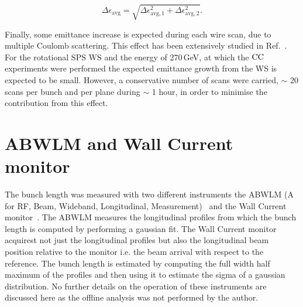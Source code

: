 \begin{equation}\label{eq:combined_uncertainty_ws}
   \Delta \epsilon_\mathrm{avg} = \sqrt{\Delta \epsilon_\mathrm{avg, 1} ^2 + \Delta \epsilon_\mathrm{avg, 2} ^2}.
\end{equation}

Finally, some emittance increase is expected during each wire scan, due to multiple Coulomb scattering. This effect has been extensively studied in Ref.~\cite{Roncarolo:1481835}. For the rotational SPS WS and the energy of 270\,GeV, at which the ${\mathrm{CC}}$ experiments were performed the expected emittance growth from the WS is expected to be small. However, a conservative number of scans were carried, $\sim$ 20 scans per bunch and per plane during $\sim$ 1 hour, in order to minimise the contribution from this effect.

\section{ABWLM and Wall Current monitor}\label{sec:ABWLM_WallCurrentMonitor}

\begin{sloppypar}
The bunch length was measured with two different instruments the ABWLM (A for RF, Beam, Wideband, Longitudinal, Measurement)~\cite{ABWLM} and the Wall Current monitor~\cite{Papotti:1124099}. The ABWLM measures the longitudinal profiles from which the bunch length is computed by performing a gaussian fit. The Wall Current monitor acquirest not just the longitudinal profiles but also the longitudinal beam position relative to the monitor i.e. the beam arrival with respect to the reference. The bunch length is estimated by computing the full width half maximum of the profiles and then using it to estimate the sigma of a gaussian distribution. No further details on the operation of these instruments are discussed here as the offline analysis was not performed by the author.
\end{sloppypar}


